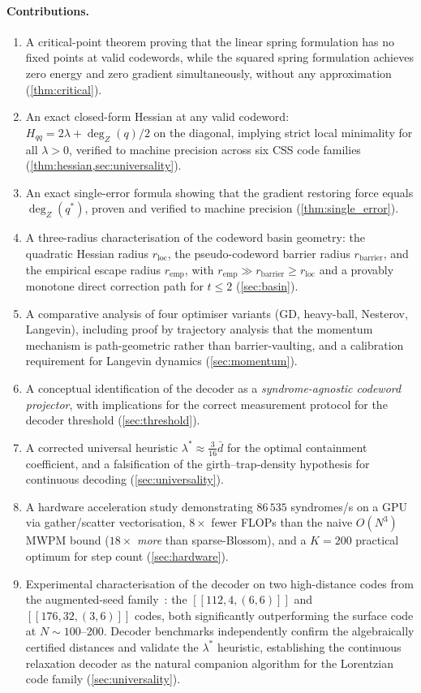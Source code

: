 \documentclass[12pt,a4paper]{article}
\theoremstyle{plain}
\theoremstyle{definition}
\theoremstyle{remark}
\newcommand{\dZ}{\operatorname{deg}_Z}
\begin{document}
\paragraph{Contributions.}
\begin{enumerate}[label=(\roman*),noitemsep]
\item A critical-point theorem proving that the linear spring formulation
  has no fixed points at valid codewords, while the squared spring
  formulation achieves zero energy and zero gradient simultaneously,
  without any approximation (\cref{thm:critical}).
\item An exact closed-form Hessian at any valid codeword:
  $H_{qq} = 2\lambda + \dZ(q)/2$ on the diagonal,
  implying strict local minimality for all $\lambda > 0$,
  verified to machine precision across six CSS code families
  (\cref{thm:hessian,sec:universality}).
\item An exact single-error formula showing that the gradient restoring
  force equals $\dZ(q^*)$, proven and verified to machine precision
  (\cref{thm:single_error}).
\item A three-radius characterisation of the codeword basin geometry:
  the quadratic Hessian radius $r_{\mathrm{loc}}$, the pseudo-codeword
  barrier radius $r_{\mathrm{barrier}}$, and the empirical escape radius
  $r_{\mathrm{emp}}$, with $r_{\mathrm{emp}} \gg r_{\mathrm{barrier}} \geq
  r_{\mathrm{loc}}$ and a provably monotone direct correction path for
  $t\leq 2$ (\cref{sec:basin}).
\item A comparative analysis of four optimiser variants
  (GD, heavy-ball, Nesterov, Langevin), including proof by trajectory
  analysis that the momentum mechanism is path-geometric rather than
  barrier-vaulting, and a calibration requirement for Langevin dynamics
  (\cref{sec:momentum}).
\item A conceptual identification of the decoder as a
  \emph{syndrome-agnostic codeword projector}, with implications for
  the correct measurement protocol for the decoder threshold
  (\cref{sec:threshold}).
\item A corrected universal heuristic $\lambda^* \approx \tfrac{3}{16}\bar{d}$
  for the optimal containment coefficient, and a falsification of the
  girth--trap-density hypothesis for continuous decoding (\cref{sec:universality}).
\item A hardware acceleration study demonstrating $86\,535$ syndromes/s
  on a GPU via gather/scatter vectorisation, $8\times$ fewer FLOPs than
  the naive $O(N^3)$ MWPM bound ($18\times$ \emph{more} than sparse-Blossom),
  and a $K=200$ practical optimum for step count
  (\cref{sec:hardware}).
\item Experimental characterisation of the decoder on two high-distance
  codes from the augmented-seed family~\cite{SchmittScale}: the
  $[[112,4,(6,6)]]$ and $[[176,32,(3,6)]]$ codes, both significantly
  outperforming the surface code at $N\sim100$--200.
  Decoder benchmarks independently confirm the algebraically certified
  distances and validate the $\lambda^*$ heuristic, establishing the
  continuous relaxation decoder as the natural companion algorithm for
  the Lorentzian code family (\cref{sec:universality}).
\end{enumerate}
\end{document}
